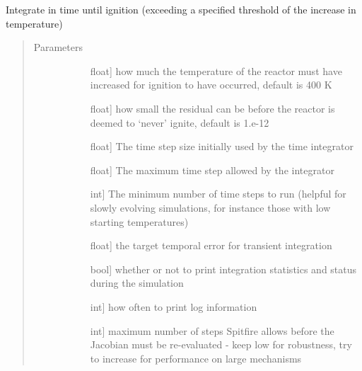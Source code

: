\documentclass[letterpaper,10pt,english]{sphinxmanual}
\begin{document}
\begin{fulllineitems}
\begin{fulllineitems}
\label{\detokenize{spitfire.chemistry.flamelet:spitfire.chemistry.flamelet.Flamelet.compute_ignition_delay}}
Integrate in time until ignition (exceeding a specified threshold of the increase in temperature)
\begin{quote}\begin{description}
\item[{Parameters}] \leavevmode\begin{description}
\item[{}] \leavevmode{[}float{]}
how much the temperature of the reactor must have increased for ignition to have occurred, default is 400 K

\item[{}] \leavevmode{[}float{]}
how small the residual can be before the reactor is deemed to ‘never’ ignite, default is 1.e-12

\item[{}] \leavevmode{[}float{]}
The time step size initially used by the time integrator

\item[{}] \leavevmode{[}float{]}
The maximum time step allowed by the integrator

\item[{}] \leavevmode{[}int{]}
The minimum number of time steps to run (helpful for slowly evolving simulations, for instance those with low starting temperatures)

\item[{}] \leavevmode{[}float{]}
the target temporal error for transient integration

\item[{}] \leavevmode{[}bool{]}
whether or not to print integration statistics and status during the simulation

\item[{}] \leavevmode{[}int{]}
how often to print log information

\item[{}] \leavevmode{[}int{]}
maximum number of steps Spitfire allows before the Jacobian must be re-evaluated - keep low for robustness, try to increase for performance on large mechanisms


\end{description}
\end{description}
\end{quote}
\end{fulllineitems}
\end{fulllineitems}
\end{document}
